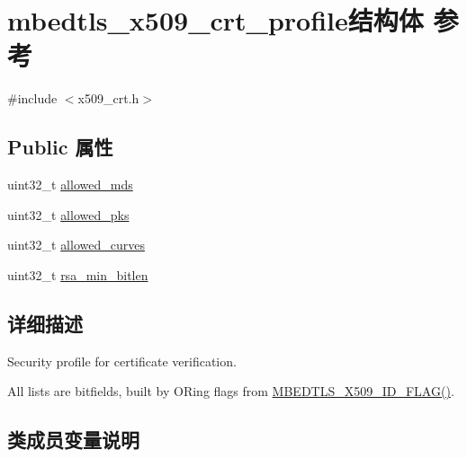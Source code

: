 \hypertarget{structmbedtls__x509__crt__profile}{}\section{mbedtls\+\_\+x509\+\_\+crt\+\_\+profile结构体 参考}
\label{structmbedtls__x509__crt__profile}


{\ttfamily \#include $<$x509\+\_\+crt.\+h$>$}

\subsection*{Public 属性}
\begin{DoxyCompactItemize}
\item 
uint32\+\_\+t \hyperlink{structmbedtls__x509__crt__profile_a1251640211d47c8e4b80b99d5b178685}{allowed\+\_\+mds}
\item 
uint32\+\_\+t \hyperlink{structmbedtls__x509__crt__profile_a13cba76eca3f0bce8a93b8f59fe69370}{allowed\+\_\+pks}
\item 
uint32\+\_\+t \hyperlink{structmbedtls__x509__crt__profile_a8149f4d17f3f465e2255f5af997e4c8e}{allowed\+\_\+curves}
\item 
uint32\+\_\+t \hyperlink{structmbedtls__x509__crt__profile_a094e9eb35ed5e9a16b67d2e8bd97e83c}{rsa\+\_\+min\+\_\+bitlen}
\end{DoxyCompactItemize}


\subsection{详细描述}
Security profile for certificate verification.

All lists are bitfields, built by O\+Ring flags from \hyperlink{group__x509__module_gaedcb73f1c615c266a348a0c62763c5de}{M\+B\+E\+D\+T\+L\+S\+\_\+\+X509\+\_\+\+I\+D\+\_\+\+F\+L\+A\+G()}. 

\subsection{类成员变量说明}
\mbox{\label{structmbedtls__x509__crt__profile_a8149f4d17f3f465e2255f5af997e4c8e}} 

